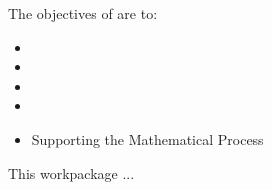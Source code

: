 \addtocounter{wpno}{1}
\begin{Workpackage}{\thewpno}
\WPTitle{\wpname{\thewpno}}


\begin{WPObjectives}
The objectives of \theWP{} are to:
\begin{itemize}
\item
\item
\item
\item
\item Supporting the Mathematical Process
\end{itemize}
\end{WPObjectives}

\begin{WPDescription}
This workpackage  ...
\end{WPDescription}

\begin{WPDeliverables}
\end{WPDeliverables}
\end{Workpackage}

